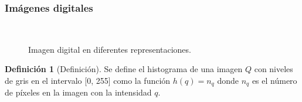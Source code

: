 \documentclass{beamer}
\theoremstyle{plain} %
\theoremstyle{definition}
\newtheorem{defn}{Definición}
\begin{document}
\begin{frame}
  \frametitle{Imágenes digitales}
  \begin{figure}
  \centering
    \quad
    \quad\ 
    \caption{Imagen digital en diferentes representaciones.}
    \label{fig:defimagen}
  \end{figure}

  \begin{defn}[Definición]
    Se define el histograma de una imagen $Q$ con niveles de gris en el intervalo [0, 255] como la función $h(q) = n_q$ donde $n_q$ es el número de píxeles en la imagen con la intensidad $q$.
  \end{defn}
\end{frame}
\end{document}
